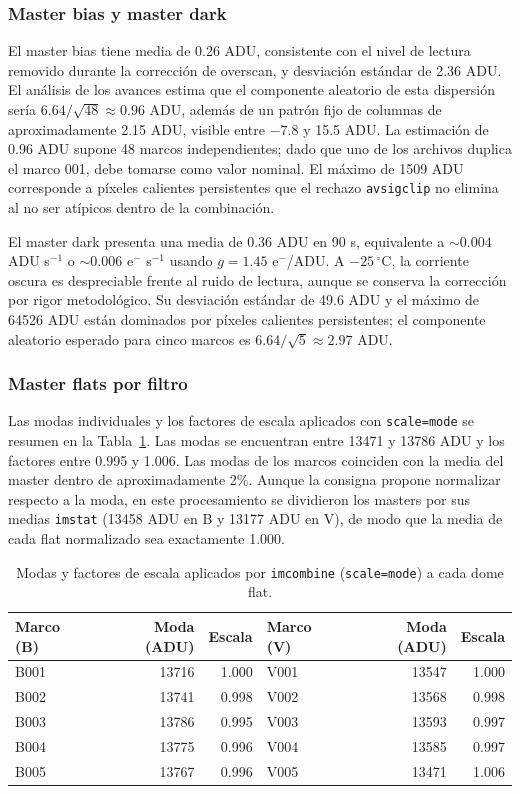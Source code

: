 \documentclass[10pt,a4paper,twocolumn]{article}
\begin{document}
\subsubsection{Master bias y master dark}

El master bias tiene media de 0.26 ADU, consistente con el nivel de lectura
removido durante la corrección de overscan, y desviación estándar de 2.36 ADU.
El análisis de los avances estima que el componente aleatorio de esta
dispersión sería $6.64/\sqrt{48}\approx0.96$ ADU, además de un patrón fijo de
columnas de aproximadamente 2.15 ADU, visible entre $-7.8$ y 15.5 ADU. La
estimación de 0.96 ADU supone 48 marcos independientes; dado que uno de los
archivos duplica el marco 001, debe tomarse como valor nominal. El máximo de
1509 ADU corresponde a píxeles calientes persistentes que el rechazo
\texttt{avsigclip} no elimina al no ser atípicos dentro de la combinación.

El master dark presenta una media de 0.36 ADU en 90 s, equivalente a
$\sim0.004$ ADU s$^{-1}$ o $\sim0.006$ e$^{-}$ s$^{-1}$ usando
$g=1.45$ e$^{-}$/ADU. A $-25\,^{\circ}$C, la corriente oscura es despreciable
frente al ruido de lectura, aunque se conserva la corrección por rigor
metodológico. Su desviación estándar de 49.6 ADU y el máximo de 64526 ADU
están dominados por píxeles calientes persistentes; el componente aleatorio
esperado para cinco marcos es $6.64/\sqrt{5}\approx2.97$ ADU.

\subsubsection{Master flats por filtro}

Las modas individuales y los factores de escala aplicados con
\texttt{scale=mode} se resumen en la Tabla~\ref{tab:modas_master}. Las modas
se encuentran entre 13471 y 13786 ADU y los factores entre 0.995 y 1.006.
Las modas de los marcos coinciden con la media del master dentro de aproximadamente 2\%.
Aunque la consigna propone normalizar respecto a la moda, en este
procesamiento se dividieron los masters por sus medias \texttt{imstat}
(13458 ADU en B y 13177 ADU en V), de modo que la media de cada flat
normalizado sea exactamente 1.000.

\begin{table}[ht]
\centering
\caption{Modas y factores de escala aplicados por \texttt{imcombine}
(\texttt{scale=mode}) a cada dome flat.}
\label{tab:modas_master}
\scriptsize
\setlength{\tabcolsep}{1.5pt}
\begin{tabular}{lrr|lrr}
\toprule
Marco (B) & Moda (ADU) & Escala & Marco (V) & Moda (ADU) & Escala \\
\midrule
B001 & 13716 & 1.000 & V001 & 13547 & 1.000 \\
B002 & 13741 & 0.998 & V002 & 13568 & 0.998 \\
B003 & 13786 & 0.995 & V003 & 13593 & 0.997 \\
B004 & 13775 & 0.996 & V004 & 13585 & 0.997 \\
B005 & 13767 & 0.996 & V005 & 13471 & 1.006 \\
\bottomrule
\end{tabular}
\end{table}
\end{document}
